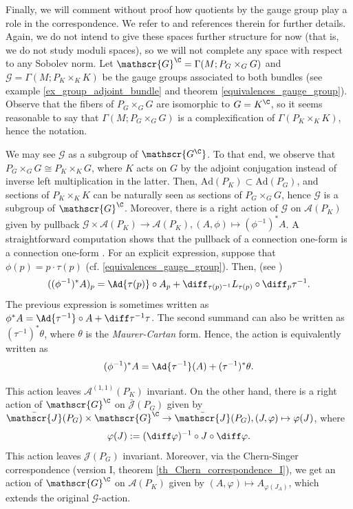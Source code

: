 Finally, we will comment without proof how quotients by the gauge group play a role in the correspondence. We refer to \parencite{Sandon_Chern_Correspondence} and references therein for further details. Again, we do not intend to give these spaces further structure for now (that is, we do not study moduli spaces), so we will not complete any space with respect to any Sobolev norm. Let \(\mathscr{G}^\C=\Gamma(M; P_G \times_ GG)\) and \(\mathscr{G}=\Gamma(M; P_K\times_K K)\) be the gauge groups associated to both bundles (see example \ref{ex_group_adjoint_bundle} and theorem \ref{equivalences_gauge_group}). Observe that the fibers of \(P_G \times_GG\) are isomorphic to \(G=K^\C\), so it seems reasonable to say that \(\Gamma(M; P_G \times_ GG)\) is a complexification of \(\Gamma(P_K \times_K K)\), hence the notation.

We may see \(\mathscr{G}\) as a subgroup of \(\mathscr{G^\C}\). To that end, we observe that \(P_G\times_GG\cong P_K \times_{K} G\), where \(K\) acts on \(G\) by the adjoint conjugation instead of inverse left multiplication in the latter. Then, \(\mathrm{Ad}(P_K)\subset \mathrm{Ad}(P_G)\), and sections of \(P_K \times_K K\) can be naturally seen as sections of \(P_G \times_G G\), hence \(\mathscr{G}\) is a subgroup of \(\mathscr{G}^\C\). Moreover, there is a right action of \(\mathscr{G}\) on \(\mathscr{A}(P_K)\) given by pullback \(\mathscr{G}\times\mathscr{A}(P_K) \to \mathscr{A}(P_K), (A, \phi) \mapsto (\phi^{-1})^*A\). A straightforward computation shows that the pullback of a connection one-form is a connection one-form \parencite[Th. 3.2.5]{bleecker2013gauge}. For an explicit expression, suppose that \(\phi(p)=p \cdot \tau(p)\) (cf. \ref{equivalences_gauge_group}). Then, (see \parencite[Th. 3.2.14]{bleecker2013gauge})
\begin{equation} \label{eq_explicit_action_gauge_group}
((\phi^{-1})^*A)_p=\Ad{\tau(p)}\circ A_p+\diff_{\tau(p)^{-1}} L_{\tau(p)} \circ \diff_p \tau^{-1}.
\end{equation}
The previous expression is sometimes written as \(\phi^*A =\Ad{\tau^{-1}}\circ A + \diff\tau^{-1}\tau\). The second summand can also be written as \((\tau^{-1})^*\theta\), where \(\theta\) is the \textit{Maurer-Cartan} form. Hence, the action is equivalently written as
\begin{equation} \label{eq_def_action_connection_gauge_group}
(\phi^{-1})^*A=\Ad{\tau^{-1}}(A) + (\tau^{-1})^*\theta.
\end{equation}

This action leaves \(\mathscr{A}^{(1,1)}(P_K)\) invariant. On the other hand, there is a right action of \(\mathscr{G}^\C\) on \(\bar{\mathscr{J}}(P_G)\) given by \(\bar{\mathscr{J}}(P_G) \times \mathscr{G}^\C \to \bar{\mathscr{J}}(P_G), (J, \varphi) \mapsto \varphi(J)\), where 
\[
\varphi(J) := (\diff \varphi)^{-1} \circ J \circ \diff \varphi.
\]
This action leaves \(\mathscr{J}(P_G)\) invariant. Moreover, via the Chern-Singer correspondence (version I, theorem \ref{th_Chern_correspondence_I}), we get an action of \(\mathscr{G}^\C\) on \(\mathscr{A}(P_K)\) given by \((A, \varphi) \mapsto A_{\varphi(J_A)}\), which extends the original \(\mathscr{G}\)-action. 

